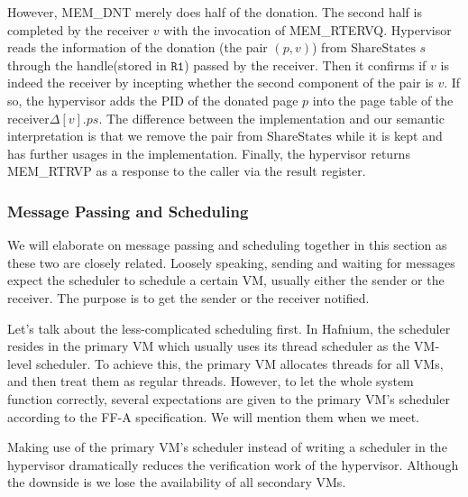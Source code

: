 \documentclass[a4paper]{article}
\newcommand*{\SSS}{\text{ShareStates}}
\newcommand*{\PID}{\text{PID}}
\begin{document}
However, MEM\_DNT merely does half of the donation. The second half is completed
by the receiver $v$ with the invocation of MEM\_RTERVQ. Hypervisor reads the
information of the donation (the pair $(p,v)$) from $\SSS$ $s$ through the
handle(stored in $\mathtt{R1}$) passed by the receiver. Then it confirms if $v$ is
indeed the receiver by incepting whether the second component of the pair is
$v$. If so, the hypervisor adds the $\PID$ of the donated page $p$ into the page
table of the receiver$\Delta[v].ps$. The difference between the implementation
and our semantic interpretation is that we remove the pair from $\SSS$ while it
is kept and has further usages in the implementation. Finally, the hypervisor
returns MEM\_RTRVP as a response to the caller via the result register.


\subsubsection{Message Passing and Scheduling}
We will elaborate on message passing and scheduling together in this section as
these two are closely related. Loosely speaking, sending and waiting for
messages expect the scheduler to schedule a certain VM, usually either the
sender or the receiver. The purpose is to get the sender or the
receiver notified.

Let's talk about the less-complicated scheduling first. In Hafnium, the
scheduler resides in the primary VM which usually uses its thread scheduler as
the VM-level scheduler. To achieve this, the primary VM allocates threads for all
VMs, and then treat them as regular threads. However, to let the whole system
function correctly, several expectations are given to the primary VM's scheduler
according to the FF-A specification. We will mention them when we meet.

Making use of the primary VM's scheduler instead of writing a scheduler in the
hypervisor dramatically reduces the verification work of the hypervisor. Although
the downside is we lose the availability of all secondary VMs.
\end{document}

